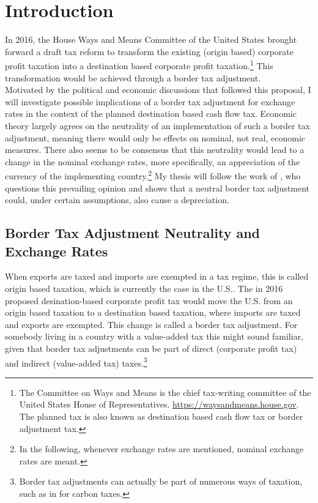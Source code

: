 

\section{Introduction}

In 2016, the House Ways and Means Committee of the United States brought forward a draft tax reform to transform the existing (origin based) corporate profit taxation into a destination based corporate profit taxation.\footnote{The Committee on Ways and Means is the chief tax-writing committee of the United States House of Representatives. \url{https://waysandmeans.house.gov}. The planned tax is also known as destination based cash flow tax or border adjustment tax.} This transformation would be achieved through a border tax adjustment. \\
Motivated by the political and economic discussions that followed this proposal, I will investigate possible implications of a border tax adjustment for exchange rates in the context of the planned destination based cash flow tax.  Economic theory largely agrees on the neutrality of an implementation of such a border tax adjustment, meaning there would only be effects on nominal, not real, economic measures. There also seems to be consensus that this neutrality would lead to a change in the nominal exchange rates, more specifically,  an appreciation of the currency of the implementing country.\footnote{In the following, whenever exchange rates are mentioned, nominal exchange rates are meant.}
My thesis will follow the work of \cite{buiter2017exchange}, who questions this prevailing opinion and shows that a neutral border tax adjustment could, under certain assumptions, also cause a depreciation. %

\subsection{Border Tax Adjustment Neutrality and Exchange Rates}
When exports are taxed and imports are exempted in a tax regime, this is called origin based taxation, which is currently the case in the U.S.. The in 2016 proposed desination-based corporate profit tax would move the U.S. from an origin based taxation to a destination based taxation, where imports are taxed and exports are exempted. This change is called a border tax adjustment. For somebody living in a country with a value-added tax this might sound familiar, given that border tax adjustments can be part of direct (corporate profit tax) and indirect (value-added tax) taxes.\footnote{Border tax adjustments can actually be part of numerous ways of taxation, such as in \cite{mckibbin2018role} for carbon taxes.}

